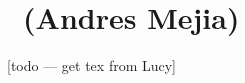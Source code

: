 \renewcommand{\thespeaker}{Andres Mejia}
\renewcommand{\thetitle}{}
\section{\thetitle~(\thespeaker)}


[todo --- get tex from Lucy]
